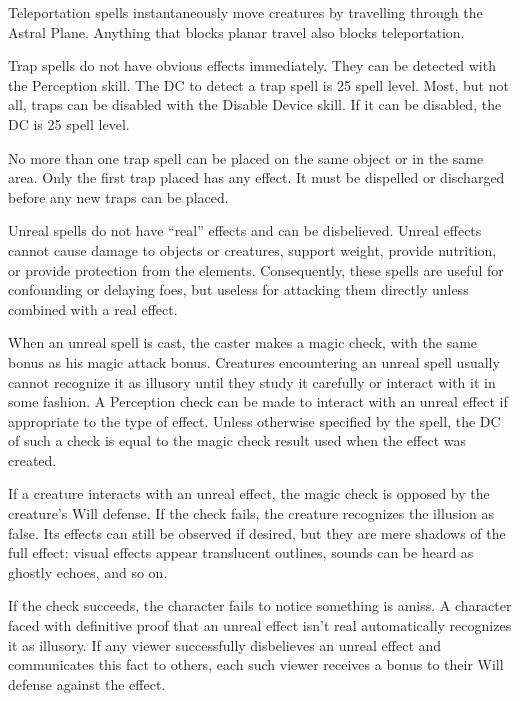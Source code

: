 \begin{itemize*}
\item Teleportation spells instantaneously move creatures by travelling through the Astral Plane. Anything that blocks planar travel also blocks teleportation.
\item Trap spells do not have obvious effects immediately. They can be detected with the Perception skill. The DC to detect a trap spell is 25 \add spell level. Most, but not all, traps can be disabled with the Disable Device skill. If it can be disabled, the DC is 25 \add spell level.
\par No more than one trap spell can be placed on the same object or in the same area. Only the first trap placed has any effect. It must be dispelled or discharged before any new traps can be placed.
\label{Unreal Spells}\item Unreal spells do not have ``real'' effects and can be disbelieved. Unreal effects cannot cause damage to objects or creatures, support weight, provide nutrition, or provide protection from the elements. Consequently, these spells are useful for confounding or delaying foes, but useless for attacking them directly unless combined with a real effect.
\par When an unreal spell is cast, the caster makes a magic check, with the same bonus as his magic attack bonus. Creatures encountering an unreal spell usually cannot recognize it as illusory until they study it carefully or interact with it in some fashion. A Perception check can be made to interact with an unreal effect if appropriate to the type of effect. Unless otherwise specified by the spell, the DC of such a check is equal to the magic check result used when the effect was created.
\par If a creature interacts with an unreal effect, the magic check is opposed by the creature's Will defense. If the check fails, the creature recognizes the illusion as false. Its effects can still be observed if desired, but they are mere shadows of the full effect: visual effects appear translucent outlines, sounds can be heard as ghostly echoes, and so on.
\par If the check succeeds, the character fails to notice something is amiss. A character faced with definitive proof that an unreal effect isn't real automatically recognizes it as illusory. If any viewer successfully disbelieves an unreal effect and communicates this fact to others, each such viewer receives a  bonus to their Will defense against the effect.
\end{itemize*}


